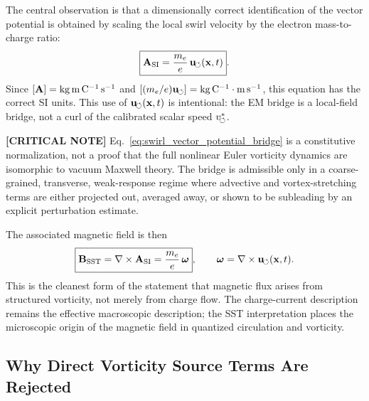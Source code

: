     The central observation is that a dimensionally correct identification of
    the vector potential is obtained by scaling the local swirl velocity by the
    electron mass-to-charge ratio:
    \begin{equation}
        \boxed{
            \mathbf{A}_{\rm SI}
            =
            \frac{m_e}{e}\,
            \mathbf{u}_{\!\boldsymbol{\circlearrowleft}}(\mathbf{x},t)
        } .
        \label{eq:swirl_vector_potential_bridge}
    \end{equation}
    Since \([\mathbf{A}]={\rm kg\,m\,C^{-1}\,s^{-1}}\) and
    \([(m_e/e)\mathbf{u}_{\!\boldsymbol{\circlearrowleft}}]={\rm kg\,C^{-1}}\cdot{\rm m\,s^{-1}}\), this equation
    has the correct SI units. This use of \(\mathbf{u}_{\!\boldsymbol{\circlearrowleft}}(\mathbf{x},t)\) is intentional: the EM bridge is a local-field bridge, not a curl of the calibrated scalar speed \(v_{\!\boldsymbol{\circlearrowleft}}^{\ast}\).

    \textbf{[CRITICAL NOTE]} Eq.~\eqref{eq:swirl_vector_potential_bridge} is a constitutive normalization, not a proof that the full nonlinear Euler vorticity dynamics are isomorphic to vacuum Maxwell theory. The bridge is admissible only in a coarse-grained, transverse, weak-response regime where advective and vortex-stretching terms are either projected out, averaged away, or shown to be subleading by an explicit perturbation estimate.
    
    The associated magnetic field is then
    \begin{equation}
        \boxed{
            \mathbf{B}_{\rm SST}
            =
            \nabla\times\mathbf{A}_{\rm SI}
            =
            \frac{m_e}{e}\,
            \boldsymbol{\omega}
        },
        \qquad
        \boldsymbol{\omega}
        =
        \nabla\times\mathbf{u}_{\!\boldsymbol{\circlearrowleft}}(\mathbf{x},t) .
        \label{eq:B_from_vorticity}
    \end{equation}
    This is the cleanest form of the statement that magnetic flux arises from
    structured vorticity, not merely from charge flow.  The charge-current
    description remains the effective macroscopic description; the SST
    interpretation places the microscopic origin of the magnetic field in
    quantized circulation and vorticity.

\subsection{Why Direct Vorticity Source Terms Are Rejected}
    
